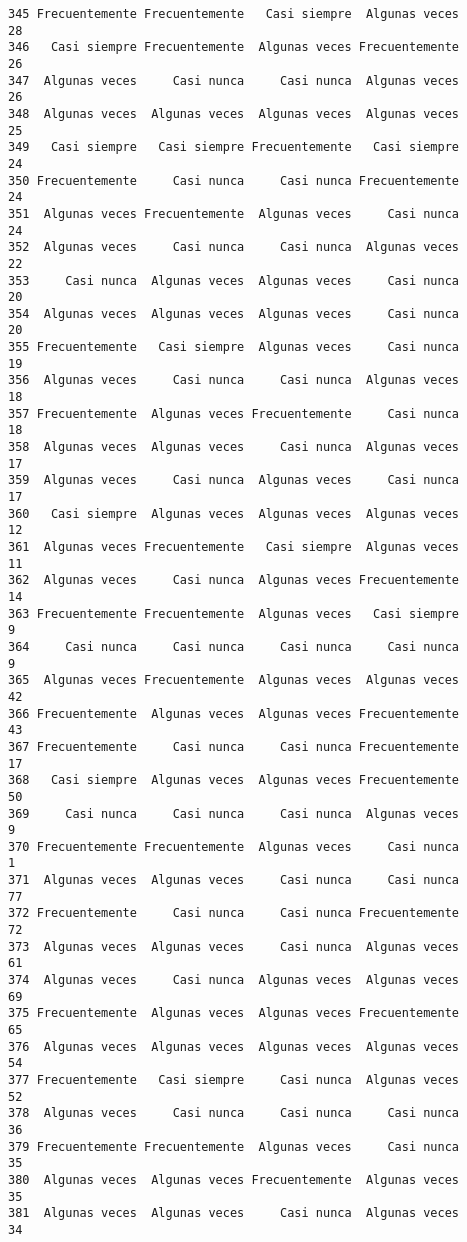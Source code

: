 \documentclass[
  letterpaper,
  DIV=11,
  numbers=noendperiod]{scrartcl}
\begin{document}
\begin{verbatim}
345 Frecuentemente Frecuentemente   Casi siempre  Algunas veces      28
346   Casi siempre Frecuentemente  Algunas veces Frecuentemente      26
347  Algunas veces     Casi nunca     Casi nunca  Algunas veces      26
348  Algunas veces  Algunas veces  Algunas veces  Algunas veces      25
349   Casi siempre   Casi siempre Frecuentemente   Casi siempre      24
350 Frecuentemente     Casi nunca     Casi nunca Frecuentemente      24
351  Algunas veces Frecuentemente  Algunas veces     Casi nunca      24
352  Algunas veces     Casi nunca     Casi nunca  Algunas veces      22
353     Casi nunca  Algunas veces  Algunas veces     Casi nunca      20
354  Algunas veces  Algunas veces  Algunas veces     Casi nunca      20
355 Frecuentemente   Casi siempre  Algunas veces     Casi nunca      19
356  Algunas veces     Casi nunca     Casi nunca  Algunas veces      18
357 Frecuentemente  Algunas veces Frecuentemente     Casi nunca      18
358  Algunas veces  Algunas veces     Casi nunca  Algunas veces      17
359  Algunas veces     Casi nunca  Algunas veces     Casi nunca      17
360   Casi siempre  Algunas veces  Algunas veces  Algunas veces      12
361  Algunas veces Frecuentemente   Casi siempre  Algunas veces      11
362  Algunas veces     Casi nunca  Algunas veces Frecuentemente      14
363 Frecuentemente Frecuentemente  Algunas veces   Casi siempre       9
364     Casi nunca     Casi nunca     Casi nunca     Casi nunca       9
365  Algunas veces Frecuentemente  Algunas veces  Algunas veces      42
366 Frecuentemente  Algunas veces  Algunas veces Frecuentemente      43
367 Frecuentemente     Casi nunca     Casi nunca Frecuentemente      17
368   Casi siempre  Algunas veces  Algunas veces Frecuentemente      50
369     Casi nunca     Casi nunca     Casi nunca  Algunas veces       9
370 Frecuentemente Frecuentemente  Algunas veces     Casi nunca       1
371  Algunas veces  Algunas veces     Casi nunca     Casi nunca      77
372 Frecuentemente     Casi nunca     Casi nunca Frecuentemente      72
373  Algunas veces  Algunas veces     Casi nunca  Algunas veces      61
374  Algunas veces     Casi nunca  Algunas veces  Algunas veces      69
375 Frecuentemente  Algunas veces  Algunas veces Frecuentemente      65
376  Algunas veces  Algunas veces  Algunas veces  Algunas veces      54
377 Frecuentemente   Casi siempre     Casi nunca  Algunas veces      52
378  Algunas veces     Casi nunca     Casi nunca     Casi nunca      36
379 Frecuentemente Frecuentemente  Algunas veces     Casi nunca      35
380  Algunas veces  Algunas veces Frecuentemente  Algunas veces      35
381  Algunas veces  Algunas veces     Casi nunca  Algunas veces      34

\end{verbatim}
\end{document}
